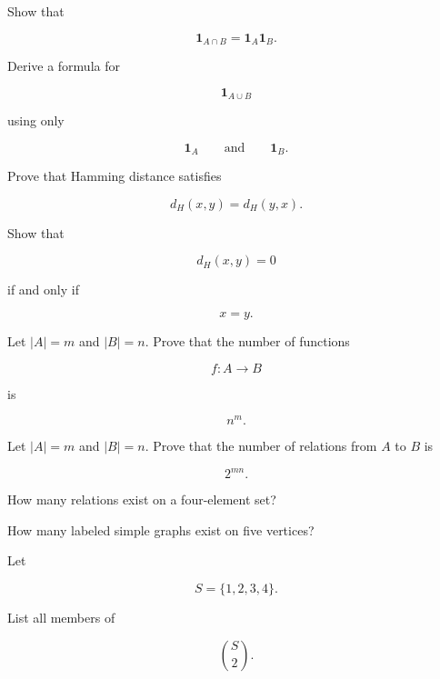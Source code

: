 \begin{exercise}[2]
Show that

\[
\mathbf{1}_{A\cap B}
=
\mathbf{1}_A\mathbf{1}_B.
\]
\end{exercise}

\begin{exercise}[2]
Derive a formula for

\[
\mathbf{1}_{A\cup B}
\]

using only

\[
\mathbf{1}_A
\qquad\text{and}\qquad
\mathbf{1}_B.
\]
\end{exercise}

\begin{exercise}[2]
Prove that Hamming distance satisfies

\[
d_H(x,y)=d_H(y,x).
\]
\end{exercise}

\begin{exercise}[2]
Show that

\[
d_H(x,y)=0
\]

if and only if

\[
x=y.
\]
\end{exercise}

\begin{exercise}[2]
Let \(|A|=m\) and \(|B|=n\). Prove that the number of functions

\[
f:A\to B
\]

is

\[
n^m.
\]
\end{exercise}

\begin{exercise}[2]
Let \(|A|=m\) and \(|B|=n\). Prove that the number of relations from
\(A\) to \(B\) is

\[
2^{mn}.
\]
\end{exercise}

\begin{exercise}[2]
How many relations exist on a four-element set?
\end{exercise}

\begin{exercise}[2]
How many labeled simple graphs exist on five vertices?
\end{exercise}

\begin{exercise}[2]
Let

\[
S=\{1,2,3,4\}.
\]

List all members of

\[
\binom{S}{2}.
\]
\end{exercise}

